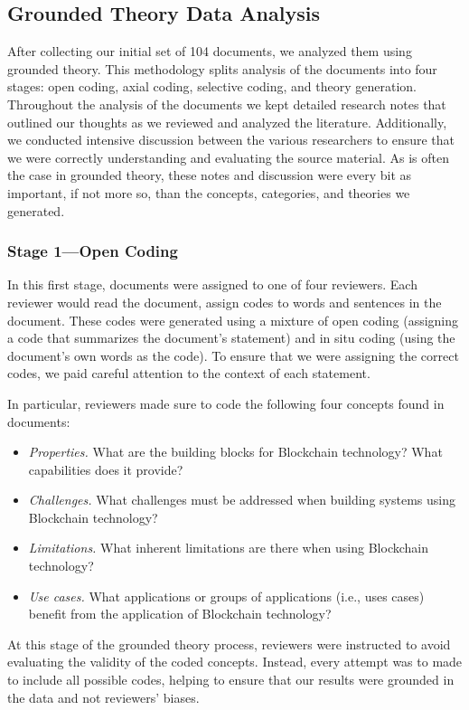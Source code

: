 \subsection{Grounded Theory Data Analysis}
After collecting our initial set of 104 documents, we analyzed them using grounded theory.
This methodology splits analysis of the documents into four stages: open coding, axial coding, selective coding, and theory generation.
Throughout the analysis of the documents we kept detailed research notes that outlined our thoughts as we reviewed and analyzed the literature.
Additionally, we conducted intensive discussion between the various researchers to ensure that we were correctly understanding and evaluating the source material.
As is often the case in grounded theory, these notes and discussion were every bit as important, if not more so, than the concepts, categories, and theories we generated.

\subsubsection{Stage 1---Open Coding}
In this first stage, documents were assigned to one of four reviewers.
Each reviewer would read the document, assign codes to words and sentences in the document.
These codes were generated using a mixture of open coding (assigning a code that summarizes the document's statement) and in situ coding (using the document's own words as the code).
To ensure that we were assigning the correct codes, we paid careful attention to the context of each statement.

In particular, reviewers made sure to code the following four concepts found in documents:
\begin{itemize}[label=$\blacksquare$]
	\item \emph{Properties.} What are the building blocks for Blockchain technology? What capabilities does it provide?
	\item \emph{Challenges.} What challenges must be addressed when building systems using Blockchain technology?
	\item \emph{Limitations.} What inherent limitations are there when using Blockchain technology?
	\item \emph{Use cases.} What applications or groups of applications (i.e., uses cases) benefit from the application of Blockchain technology?
\end{itemize}

At this stage of the grounded theory process, reviewers were instructed to avoid evaluating the validity of the coded concepts.
Instead, every attempt was to made to include all possible codes, helping to ensure that our results were grounded in the data and not reviewers' biases.

